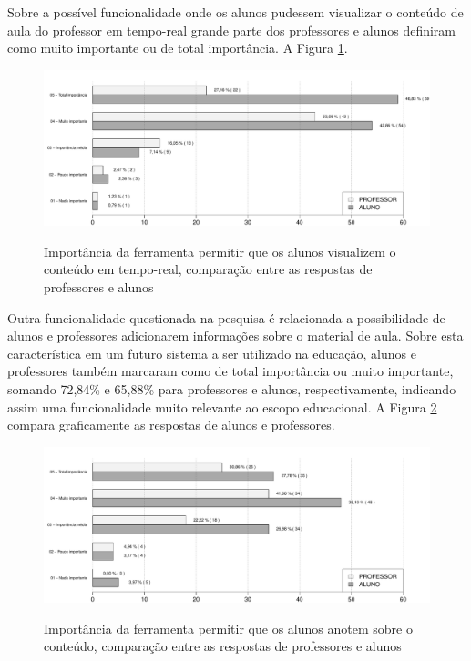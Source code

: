 Sobre a possível funcionalidade onde os alunos pudessem visualizar o conteúdo de aula do professor em tempo-real grande parte dos professores e alunos definiram como muito importante ou de total importância. A Figura \ref{fig:grafico_visualizar}.

\begin{figure}[!h]
\centering
\caption{Importância da ferramenta permitir que os alunos visualizem o conteúdo em tempo-real, comparação entre as respostas de professores e alunos}
\includegraphics[width=1.0\textwidth]{pdfs/alunos-professores/funcionalidades-visualizar-conteudo.pdf} 
\label{fig:grafico_visualizar} 
\end{figure}

Outra funcionalidade questionada na pesquisa é relacionada a possibilidade de alunos e professores adicionarem informações sobre o material de aula. Sobre esta característica em um futuro sistema a ser utilizado na educação, alunos e professores também marcaram como de total importância ou muito importante, somando 72,84\% e 65,88\% para professores e alunos, respectivamente, indicando assim uma funcionalidade muito relevante ao escopo educacional. A Figura \ref{fig:grafico_anotacoes} compara graficamente as respostas de alunos e professores. 

\begin{figure}[!h]
\centering
\caption{Importância da ferramenta permitir que os alunos anotem sobre o conteúdo, comparação entre as respostas de professores e alunos}
\includegraphics[width=1.0\textwidth]{pdfs/alunos-professores/funcionalidades-anotacoes.pdf} 
\label{fig:grafico_anotacoes} 
\end{figure}


